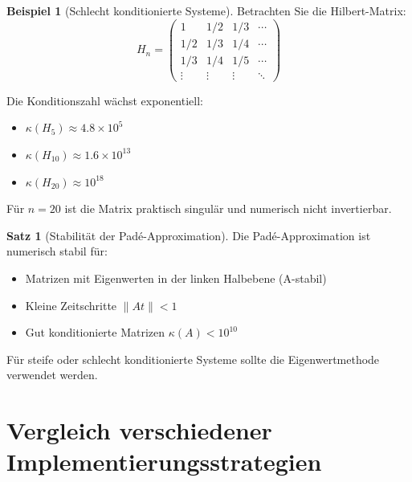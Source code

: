 \documentclass[a4paper,12pt]{report}
\theoremstyle{definition}
\newtheorem{beispiel}{Beispiel}
\newtheorem{satz}{Satz}
\begin{document}
	\begin{beispiel}[Schlecht konditionierte Systeme]
		Betrachten Sie die Hilbert-Matrix:
		\[
		H_n = \begin{pmatrix}
			1 & 1/2 & 1/3 & \cdots \\
			1/2 & 1/3 & 1/4 & \cdots \\
			1/3 & 1/4 & 1/5 & \cdots \\
			\vdots & \vdots & \vdots & \ddots
		\end{pmatrix}
		\]
		
		Die Konditionszahl wächst exponentiell:
		\begin{itemize}
			\item $\kappa(H_5) \approx 4.8 \times 10^5$
			\item $\kappa(H_{10}) \approx 1.6 \times 10^{13}$
			\item $\kappa(H_{20}) \approx 10^{18}$
		\end{itemize}
		
		Für $n = 20$ ist die Matrix praktisch singulär und numerisch nicht invertierbar.
	\end{beispiel}
	
	\begin{satz}[Stabilität der Padé-Approximation]
		Die Padé-Approximation ist numerisch stabil für:
		\begin{itemize}
			\item Matrizen mit Eigenwerten in der linken Halbebene (A-stabil)
			\item Kleine Zeitschritte $\|At\| < 1$
			\item Gut konditionierte Matrizen $\kappa(A) < 10^{10}$
		\end{itemize}
		
		Für steife oder schlecht konditionierte Systeme sollte die Eigenwertmethode verwendet werden.
	\end{satz}
	
	\section{Vergleich verschiedener Implementierungsstrategien}
	
\end{document}
